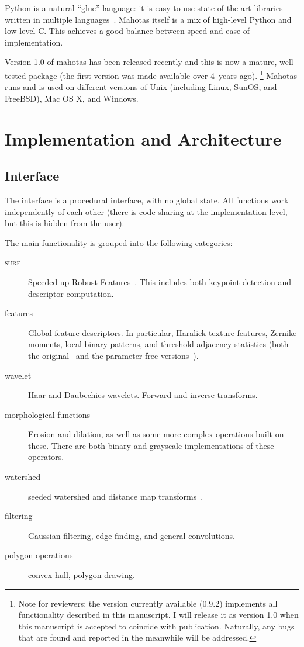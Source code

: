 \documentclass{scrartcl}
\newcommand*{\cpp}{{C\nolinebreak[4]\hspace{-.05em}\raisebox{.4ex}{\tiny\textbf{++}}}}
\begin{document}
Python is a natural ``glue'' language: it is easy to use state-of-the-art
libraries written in multiple languages~\citep{10.1109/MCSE.2007.58}. Mahotas
itself is a mix of high-level Python and low-level \cpp{}. This achieves a good
balance between speed and ease of implementation.

Version 1.0 of mahotas has been released recently and this is now a mature,
well-tested package (the first version was made available over 4~years ago).
\footnote{Note for reviewers: the version currently available (0.9.2)
implements all functionality described in this manuscript. I will release it as
version 1.0 when this manuscript is accepted to coincide with publication.
Naturally, any bugs that are found and reported in the meanwhile will be
addressed.} Mahotas runs and is used on different versions of Unix (including
Linux, SunOS, and FreeBSD), Mac OS X, and Windows.

\section{Implementation and Architecture}

\subsection{Interface}

The interface is a procedural interface, with no global state. All functions
work independently of each other (there is code sharing at the implementation
level, but this is hidden from the user).

The main functionality is grouped into the following categories:

\begin{description}
\item[\textsc{surf}] Speeded-up Robust Features~\citep{eth_biwi_00517}. This
includes both keypoint detection and descriptor computation.
\item[features] Global feature descriptors. In particular, Haralick texture
features, Zernike moments, local binary patterns, and threshold adjacency
statistics (both the original~\citep{Hamilton2007} and the parameter-free
versions~\citep{Coelho2010}).
\item[wavelet] Haar and Daubechies wavelets. Forward and inverse transforms.
\item[morphological functions] Erosion and dilation, as well as some more
complex operations built on these. There are both binary and grayscale
implementations of these operators.
\item[watershed] seeded watershed and distance map
transforms~\citep{felzenszwalb}.
\item[filtering] Gaussian filtering, edge finding, and general convolutions.
\item[polygon operations] convex hull, polygon drawing.
\end{description}
\end{document}
